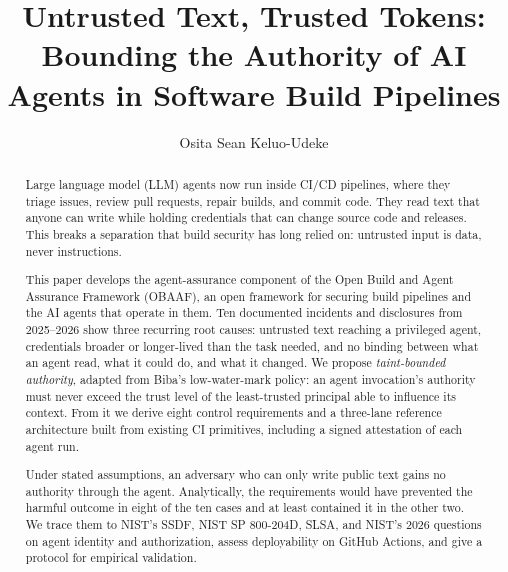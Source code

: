 \documentclass[acmsmall,screen,review]{acmart}
\begin{document}
\title[Untrusted Text, Trusted Tokens]{Untrusted Text, Trusted Tokens: Bounding the Authority of AI Agents in Software Build Pipelines}

\author{Osita Sean Keluo-Udeke}

\renewcommand{\shortauthors}{Keluo-Udeke}

\begin{abstract}
Large language model (LLM) agents now run inside CI/CD pipelines, where they triage issues, review pull requests, repair builds, and commit code. They read text that anyone can write while holding credentials that can change source code and releases. This breaks a separation that build security has long relied on: untrusted input is data, never instructions.

This paper develops the agent-assurance component of the Open Build and Agent Assurance Framework (OBAAF), an open framework for securing build pipelines and the AI agents that operate in them. Ten documented incidents and disclosures from 2025–2026 show three recurring root causes: untrusted text reaching a privileged agent, credentials broader or longer-lived than the task needed, and no binding between what an agent read, what it could do, and what it changed. We propose \emph{taint-bounded authority}, adapted from Biba's low-water-mark policy: an agent invocation's authority must never exceed the trust level of the least-trusted principal able to influence its context. From it we derive eight control requirements and a three-lane reference architecture built from existing CI primitives, including a signed attestation of each agent run.

Under stated assumptions, an adversary who can only write public text gains no authority through the agent. Analytically, the requirements would have prevented the harmful outcome in eight of the ten cases and at least contained it in the other two. We trace them to NIST's SSDF, NIST SP 800-204D, SLSA, and NIST's 2026 questions on agent identity and authorization, assess deployability on GitHub Actions, and give a protocol for empirical validation.
\end{abstract}

\end{document}
